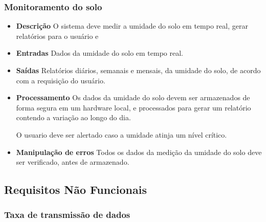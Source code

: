 \subsubsection{Monitoramento do solo}
\begin{itemize}

	\item \textbf{Descrição}
	O sistema deve medir a umidade do solo em tempo real, gerar relatórios para o usuário e

	\item \textbf{Entradas}
	Dados da umidade do solo em tempo real.

	\item \textbf{Saídas}
	Relatórios diários, semanais e mensais, da umidade do solo, de acordo com a requisição do usuário.

	\item \textbf{Processamento}
	Os dados da umidade do solo devem ser armazenados de forma segura em um hardware local, e processados para gerar um relatório contendo a variação ao longo do dia.

	O usuario deve ser alertado caso a umidade atinja um nível crítico.

	\item \textbf{Manipulação de erros}
	Todos os dados da medição da umidade do solo deve ser verificado, antes de armazenado.

\end{itemize}

\subsection{Requisitos Não Funcionais}

\subsubsection{Taxa de transmissão de dados}

